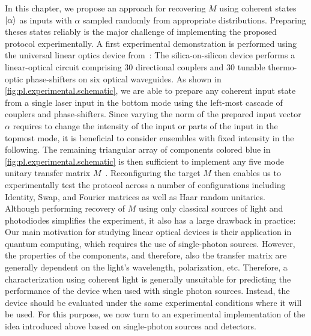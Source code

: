 In this chapter, we propose an approach for recovering $M$ using coherent states $\ket{\alpha}$ as inputs with $\alpha$ sampled randomly from appropriate distributions.
Preparing theses states reliably is the major challenge of implementing the proposed protocol experimentally.
A first experimental demonstration is performed using the universal linear optics device from~\cite{Carolan_2015_Universal}:
The silica-on-silicon device performs a linear-optical circuit comprising 30 directional couplers and 30 tunable thermo-optic phase-shifters on six optical waveguides.
As shown in \cref{fig:pl.experimental.schematic}, we are able to prepare any coherent input state from a single laser input in the bottom mode using the left-most cascade of couplers and phase-shifters.
Since varying the norm of the prepared input vector $\alpha$ requires to change the intensity of the input or  parts of the input in the topmost mode, it is beneficial to consider ensembles with fixed intensity in the following.
The remaining triangular array of components colored blue in \cref{fig:pl.experimental.schematic} is then sufficient to implement any five mode unitary transfer matrix $M$~\cite{Reck_1994_Experimental}.
Reconfiguring the target $M$ then enables us to experimentally test the protocol across a number of configurations including Identity, Swap, and Fourier matrices as well as Haar random unitaries.\\



Although performing recovery of $M$ using only classical sources of light and photodiodes simplifies the experiment, it also has a large drawback in practice:
Our main motivation for studying linear optical devices is their application in quantum computing, which requires the use of single-photon sources.
However, the properties of the components, and therefore, also the transfer matrix are generally dependent on the light's wavelength, polarization, etc.
Therefore, a characterization using coherent light is generally unsuitable for predicting the performance of the device when used with single photon sources.
Instead, the device should be evaluated under the same experimental conditions where it will be used.
For this purpose, we now turn to an experimental implementation of the idea introduced above based on single-photon sources and detectors.

